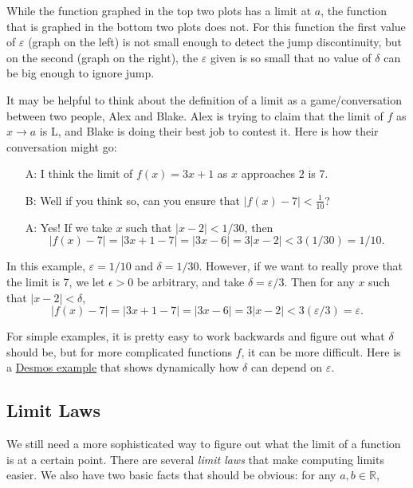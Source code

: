 \documentclass{article}
\newcommand{\R}{\mathbb{R}}
\theoremstyle{definition}
\theoremstyle{definition}
\begin{document}
While the function graphed in the top two plots has a limit at $a$, the function that is graphed in the bottom two plots does not. For this function the first value of $\varepsilon$ (graph on the left) is not small enough to detect the jump discontinuity, but on the second (graph on the right), the $\varepsilon$ given is so small that no value of $\delta$ can be big enough to ignore jump.

It may be helpful to think about the definition of a limit as a game/conversation between two people, Alex and Blake. Alex is trying to claim that the limit of $f$ as $x\to a$ is L, and Blake is doing their best job to contest it. Here is how their conversation might go:
\begin{itemize}
\item[A:] I think the limit of $f(x)=3x+1$ as $x$ approaches $2$ is 7.
\item[B:] Well if you think so, can you ensure that $|f(x)-7|<\frac{1}{10}$?
\item[A:] Yes! If we take $x$ such that $|x-2|<1/30$, then
$$|f(x)-7|=|3x + 1 - 7| = |3x-6| = 3|x-2| < 3(1/30) = 1/10.$$
\end{itemize}
In this example, $\varepsilon = 1/10$ and $\delta = 1/30$. However, if we want to really prove that the limit is 7, we let $\epsilon>0$ be arbitrary, and take $\delta = \varepsilon/3$. Then for any $x$ such that $|x-2|<\delta$,
$$|f(x)-7|=|3x + 1 - 7| = |3x-6| = 3|x-2| < 3(\varepsilon/3) = \varepsilon.$$

For simple examples, it is pretty easy to work backwards and figure out what $\delta$ should be, but for more complicated functions $f$, it can be more difficult. Here is a \href{https://www.desmos.com/calculator/cuoca85inx}{Desmos example} that shows dynamically how $\delta$ can depend on $\varepsilon$.


\subsection{Limit Laws}

We still need a more sophisticated way to figure out what the limit of a function is at a certain point. There are several \textit{limit laws} that make computing limits easier. We also have two basic facts that should be obvious: for any $a,b\in \R$,
\end{document}
